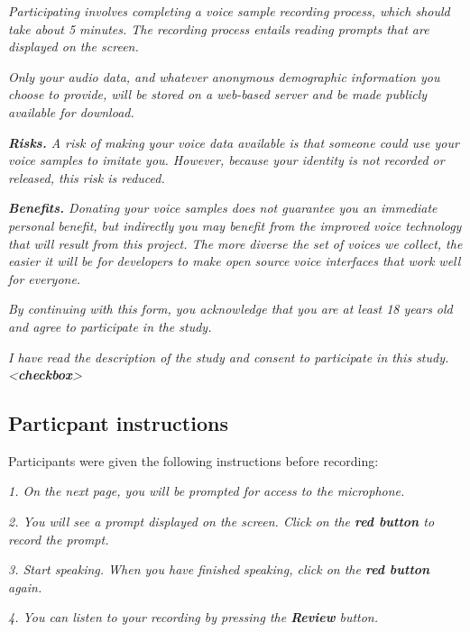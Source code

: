 \documentclass{article}
\begin{document}
\textit{Participating involves completing a voice sample recording process, which should take about 5 minutes. The recording process entails reading prompts that are displayed on the screen.}
                        
                        

                        \textit{Only your audio data, and whatever anonymous demographic information you choose to provide, will be stored on a web-based server and be made publicly available for download.}
                        

                        \textit{\textbf{Risks.} A risk of making your voice data available is that someone could use your voice samples to imitate you. However, because your identity is not recorded or released, this risk is reduced.}

                        \textit{\textbf{Benefits.} Donating your voice samples does not guarantee you an immediate personal benefit, but indirectly you may benefit from the improved voice technology that will result from this project. The more diverse the set of voices we collect, the easier it will be for developers to make open source voice interfaces that work well for everyone.}

                        \textit{By continuing with this form, you acknowledge that you are at least 18 years old and agree to participate in the study.}
                        
                        \textit{I have read the description of the study and consent to participate in this study. <\textbf{checkbox}>}
                        

\subsection{Particpant instructions}\label{participant-instructions}
Participants were given the following instructions before recording:

\textit{1. On the next page, you will be prompted for access to the microphone.}
    
\textit{2. You will see a prompt displayed on the screen. Click on the \textbf{red button} to record the prompt.}
    
\textit{3. Start speaking. When you have finished speaking, click on the \textbf{red button} again.}
    
\textit{4. You can listen to your recording by pressing the \textbf{Review} button.}
    
\end{document}
